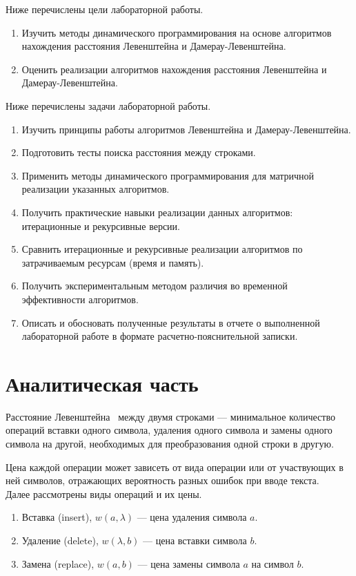 \documentclass[12pt]{report}
\begin{document}
    Ниже перечислены цели лабораторной работы.
    \begin{enumerate}
        \item Изучить методы динамического программирования на основе алгоритмов нахождения расстояния
        Левенштейна и Дамерау-Левенштейна.
        \item Оценить реализации алгоритмов нахождения расстояния Левенштейна и Дамерау-Левенштейна.
    \end{enumerate}

    Ниже перечислены задачи лабораторной работы.
    \begin{enumerate}
        \item Изучить принципы работы алгоритмов Левенштейна и Дамерау-Левенштейна.
        \item Подготовить тесты поиска расстояния между строками.
        \item Применить методы динамического программирования для матричной реализации указанных алгоритмов.
        \item Получить практические навыки реализации данных алгоритмов: итерационные и рекурсивные версии.
        \item Сравнить итерационные и рекурсивные реализации алгоритмов по затрачиваемым ресурсам (время и память).
        \item Получить экспериментальным методом различия во временной эффективности алгоритмов.
        \item Описать и обосновать полученные результаты в отчете о выполненной лабораторной работе
        в формате расчетно-пояснительной записки.
    \end{enumerate}

    \newpage


    \chapter{Аналитическая часть}

    Расстояние Левенштейна~\cite{levenshtein} между двумя строками ---
    минимальное количество операций вставки одного символа, удаления одного символа
    и замены одного символа на другой, необходимых для преобразования одной строки в другую.

    Цена каждой операции может зависеть от вида операции или от участвующих в ней символов, отражающих вероятность
    разных ошибок при вводе текста.
    \\
    Далее рассмотрены виды операций и их цены.
    \begin{enumerate}
        \item Вставка (insert), $w(a,\lambda)$ --- цена удаления символа $a$.
        \item Удаление (delete), $w(\lambda, b)$ --- цена вставки символа $b$.
        \item Замена (replace), $w(a, b)$ --- цена замены символа $a$ на символ $b$.
    \end{enumerate}
\end{document}
